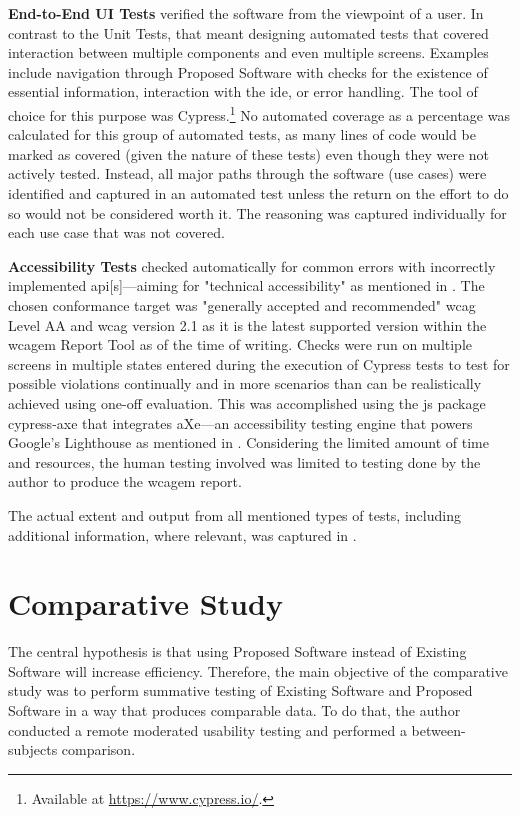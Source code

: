 \textbf{End-to-End UI Tests} verified the software from the viewpoint of a user.
In contrast to the Unit Tests, that meant designing automated tests that covered interaction between multiple components and even multiple screens.
Examples include navigation through Proposed Software with checks for the existence of essential information, interaction with the \gls{ide}, or error handling.
The tool of choice for this purpose was Cypress.\footnote{Available at \url{https://www.cypress.io/}.}
No automated coverage as a percentage was calculated for this group of automated tests, as many lines of code would be marked as covered (given the nature of these tests) even though they were not actively tested.
Instead, all major paths through the software (use cases) were identified and captured in an automated test unless the return on the effort to do so would not be considered worth it.
The reasoning was captured individually for each use case that was not covered.

\textbf{Accessibility Tests} checked automatically for common errors with incorrectly implemented \gls{api}[s]---aiming for "technical accessibility" as mentioned in .
The chosen conformance target was "generally accepted and recommended" \gls{wcag} Level AA \parencite{WAI_Evaluation_Methodology_Note} and \gls{wcag} version 2.1 as it is the latest supported version within the \gls{wcagem} Report Tool as of the time of writing.
Checks were run on multiple screens in multiple states entered during the execution of Cypress tests to test for possible violations continually and in more scenarios than can be realistically achieved using one-off evaluation.
This was accomplished using the \gls{js} package cypress-axe that integrates aXe---an accessibility testing engine that powers Google's Lighthouse as mentioned in .
Considering the limited amount of time and resources, the human testing involved was limited to testing done by the author to produce the \gls{wcagem} report.

The actual extent and output from all mentioned types of tests, including additional information, where relevant, was captured in .

\section{Comparative Study}

The central hypothesis is that using Proposed Software instead of Existing Software will increase efficiency.
Therefore, the main objective of the comparative study was to perform summative testing of Existing Software and Proposed Software in a way that produces comparable data.
To do that, the author conducted a remote moderated usability testing and performed a between-subjects comparison.

